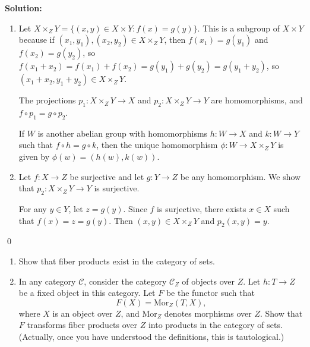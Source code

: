 \noindent\textbf{Solution:}
\begin{enumerate}[label=(\alph*)]
\item Let $X \times_Z Y = \{(x, y) \in X \times Y : f(x) = g(y)\}$. This is a subgroup of $X \times Y$ because if $(x_1, y_1), (x_2, y_2) \in X \times_Z Y$, then $f(x_1) = g(y_1)$ and $f(x_2) = g(y_2)$, so $f(x_1 + x_2) = f(x_1) + f(x_2) = g(y_1) + g(y_2) = g(y_1 + y_2)$, so $(x_1 + x_2, y_1 + y_2) \in X \times_Z Y$.

The projections $p_1: X \times_Z Y \to X$ and $p_2: X \times_Z Y \to Y$ are homomorphisms, and $f \circ p_1 = g \circ p_2$.

If $W$ is another abelian group with homomorphisms $h: W \to X$ and $k: W \to Y$ such that $f \circ h = g \circ k$, then the unique homomorphism $\phi: W \to X \times_Z Y$ is given by $\phi(w) = (h(w), k(w))$.

\item Let $f: X \to Z$ be surjective and let $g: Y \to Z$ be any homomorphism. We show that $p_2: X \times_Z Y \to Y$ is surjective.

For any $y \in Y$, let $z = g(y)$. Since $f$ is surjective, there exists $x \in X$ such that $f(x) = z = g(y)$. Then $(x, y) \in X \times_Z Y$ and $p_2(x, y) = y$.
\end{enumerate}


\qed
\begin{problembox}
\begin{enumerate}[label=(\alph*)]
\item Show that fiber products exist in the category of sets.
\item In any category $\mathcal{C}$, consider the category $\mathcal{C}_Z$ of objects over $Z$. Let $h: T \rightarrow Z$ be a fixed object in this category. Let $F$ be the functor such that
\[F(X) = \text{Mor}_Z(T, X),\]
where $X$ is an object over $Z$, and $\text{Mor}_Z$ denotes morphisms over $Z$. Show that $F$ transforms fiber products over $Z$ into products in the category of sets. (Actually, once you have understood the definitions, this is tautological.)
\end{enumerate}
\end{problembox}

